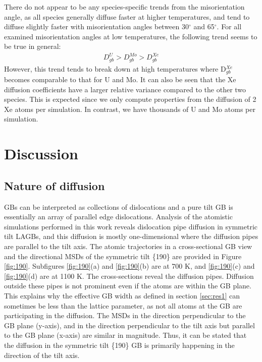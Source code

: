 \documentclass{elsarticle}
\begin{document}
There do not appear to be any species-specific trends from the misorientation angle, as all species generally diffuse faster at higher temperatures, and tend to diffuse slightly faster with misorientation angles between 30$^{\circ}$ and 65$^{\circ}$. For all examined misorientation angles at low temperatures, the following trend seems to be true in general:
\begin{align}
	D_{gb}^U > D_{gb}^{Mo} > D_{gb}^{Xe}
\end{align}
However, this trend tends to break down at high temperatures where D$_{gb}^{Xe}$ becomes comparable to that for U and Mo. It can also be seen that the Xe diffusion coefficients have a larger relative variance compared to the other two species. This is expected since we only compute properties from the diffusion of 2 Xe atoms per simulation. In contrast, we have thousands of U and Mo atoms per simulation.


\FloatBarrier
\section{Discussion}

\subsection{Nature of diffusion}

GBs can be interpreted as collections of dislocations and a pure tilt GB is essentially an array of parallel edge dislocations. Analysis of the atomistic simulations performed in this work reveals dislocation pipe diffusion in symmetric tilt LAGBs, and this diffusion is mostly one-dimensional where the diffusion pipes are parallel to the tilt axis. The atomic trajectories in a cross-sectional GB view and the directional MSDs of the symmetric tilt \{190\} are provided in Figure \ref{fig:190}. Subfigures \ref{fig:190}(a) and \ref{fig:190}(b) are at 700 K, and \ref{fig:190}(c) and \ref{fig:190}(d) are at 1100 K. The cross-sections reveal the diffusion pipes. Diffusion outside these pipes is not prominent even if the atoms are within the GB plane. This explains why the effective GB width as defined in section \ref{sec:res1} can sometimes be less than the lattice parameter, as not all atoms at the GB are participating in the diffusion. The MSDs in the direction perpendicular to the GB plane (y-axis), and in the direction perpendicular to the tilt axis but parallel to the GB plane (x-axis) are similar in magnitude. Thus, it can be stated that the diffusion in the symmetric tilt \{190\} GB is primarily happening in the direction of the tilt axis.
\end{document}

